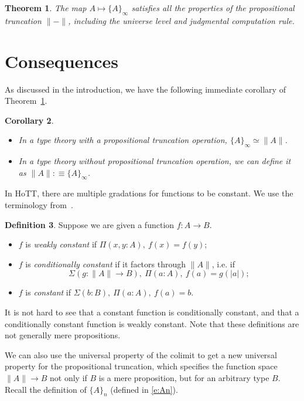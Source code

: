 \documentclass[square]{sigplanconf}
\newcommand{\fa}[2]{\ensuremath{\Pi(#1),\ #2}}
\newcommand{\ex}[2]{\ensuremath{\Sigma(#1),\ #2}}
\newtheorem{theorem}{Theorem}[section]
\newtheorem{corollary}[theorem]{Corollary}
\theoremstyle{definition}
\newtheorem{definition}[theorem]{Definition}
\theoremstyle{remark}
\begin{document}
\begin{theorem}\label{t:main}
The map $A\mapsto \{A\}_\infty$ satisfies all the properties of the propositional truncation
$\|{-}\|$, including the universe level and judgmental computation rule.
\end{theorem}

\section{Consequences}\label{s:consequences}
As discussed in the introduction, we have the following immediate corollary of Theorem~\ref{t:main}.
\begin{corollary}\label{c:main}\mbox{}
\begin{itemize}
\item In a type theory with a propositional truncation operation, $\{A\}_\infty\simeq \|A\|$.
\item In a type theory without propositional truncation operation, we can define it as $\|A\|:\equiv
  \{A\}_\infty$.
\end{itemize}
\end{corollary}

In HoTT, there are multiple gradations for functions to be constant. We use the terminology
from~\cite{Shulman2015constantnessblog}.

\begin{definition}
Suppose we are given a function $f:A\to B$.
\begin{itemize}
\item $f$ is \emph{weakly constant} if $\fa{x, y : A}{f(x) = f(y)}$;
\item $f$ is \emph{conditionally constant} if it factors through $\|A\|$, i.e. if $$\ex{g:\|A\|\to
  B}{\fa{a : A}{f(a)=g(|a|)}};$$
\item $f$ is \emph{constant} if $\ex{b : B}{\fa{a : A}{f(a)=b}}$.
\end{itemize}
\end{definition}
It is not hard to see that a constant function is conditionally constant, and that a conditionally
constant function is weakly constant. Note that these definitions are not generally mere
propositions.

We can also use the universal property of the colimit to get a new universal property for the
propositional truncation, which specifies the function space $\|A\|\to B$ not only if $B$ is a mere
proposition, but for an arbitrary type $B$. Recall the definition of $\{A\}_n$ (defined in
\eqref{e:An}).
\end{document}
